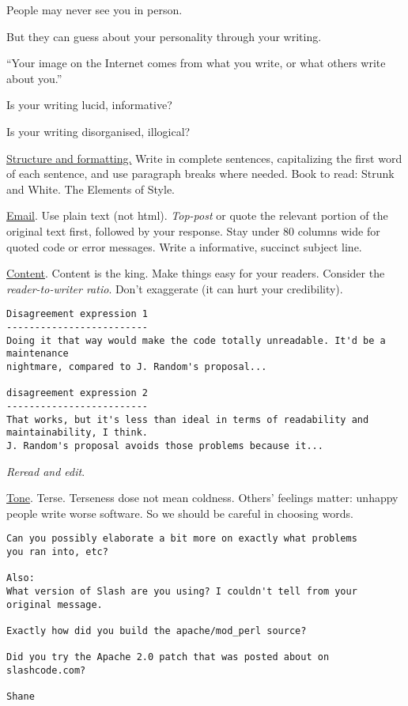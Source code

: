 \documentclass[landscape,30pt]{foils}
\begin{document}

People may never see you in person.

But they can guess about your personality through your writing.

``Your image on the Internet comes from what you write, or what others write about you.''

Is your writing lucid, informative?

Is your writing disorganised, illogical?

\underline{Structure and formatting.}   Write in complete sentences, capitalizing the first word of each sentence, and use paragraph breaks where needed.  Book to read: Strunk and White.  The Elements of Style.

\underline{Email}.  Use plain text (not html).  {\em Top-post} or quote the relevant portion of the original text first, followed by your response.  Stay under 80 columns wide for quoted code or error messages.  Write a informative, succinct subject line.

\underline{Content}.  Content is the king.  Make things easy for your readers. Consider the {\em reader-to-writer ratio}. Don't exaggerate (it can hurt your credibility).

{\tiny
\begin{verbatim}
Disagreement expression 1
-------------------------
Doing it that way would make the code totally unreadable. It'd be a maintenance
nightmare, compared to J. Random's proposal...

disagreement expression 2
-------------------------
That works, but it's less than ideal in terms of readability and maintainability, I think.
J. Random's proposal avoids those problems because it...
\end{verbatim}
}

{\em Reread and edit}.

\underline{Tone}. Terse.   Terseness dose not mean coldness.  Others' feelings matter: unhappy people write worse software.  So we should be careful in choosing words.

\begin{verbatim}
Can you possibly elaborate a bit more on exactly what problems
you ran into, etc?

Also:
What version of Slash are you using? I couldn't tell from your
original message.

Exactly how did you build the apache/mod_perl source?

Did you try the Apache 2.0 patch that was posted about on
slashcode.com?

Shane
\end{verbatim}
\end{document}
